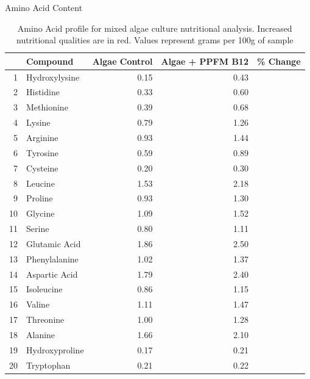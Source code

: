 \documentclass[8pt]{beamer}\usepackage[]{graphicx}\usepackage[]{color}
\begin{document}
\begin{frame}{Amino Acid Content}

\begin{table}[ht]
\centering
{\small
\begin{tabular}{rlrrl}
  \hline
 & Compound & Algae Control & Algae + PPFM B12 & \% Change \\ 
  \hline
1 & Hydroxylysine & 0.15 & 0.43 & \textbf{\color{red}{186.67}} \\ 
  2 & Histidine & 0.33 & 0.60 & \textbf{\color{red}{81.82}} \\ 
  3 & Methionine & 0.39 & 0.68 & \textbf{\color{red}{74.36}} \\ 
  4 & Lysine & 0.79 & 1.26 & \textbf{\color{red}{59.49}} \\ 
  5 & Arginine & 0.93 & 1.44 & \textbf{\color{red}{54.84}} \\ 
  6 & Tyrosine & 0.59 & 0.89 & \textbf{\color{red}{50.85}} \\ 
  7 & Cysteine & 0.20 & 0.30 & \textbf{\color{red}{50.00}} \\ 
  8 & Leucine & 1.53 & 2.18 & \textbf{\color{red}{42.48}} \\ 
  9 & Proline & 0.93 & 1.30 & \textbf{\color{red}{39.78}} \\ 
  10 & Glycine & 1.09 & 1.52 & \textbf{\color{red}{39.45}} \\ 
  11 & Serine & 0.80 & 1.11 & \textbf{\color{red}{38.75}} \\ 
  12 & Glutamic Acid & 1.86 & 2.50 & \textbf{\color{red}{34.41}} \\ 
  13 & Phenylalanine & 1.02 & 1.37 & \textbf{\color{red}{34.31}} \\ 
  14 & Aspartic Acid & 1.79 & 2.40 & \textbf{\color{red}{34.08}} \\ 
  15 & Isoleucine & 0.86 & 1.15 & \textbf{\color{red}{33.72}} \\ 
  16 & Valine & 1.11 & 1.47 & \textbf{\color{red}{32.43}} \\ 
  17 & Threonine & 1.00 & 1.28 & \textbf{\color{red}{28.00}} \\ 
  18 & Alanine & 1.66 & 2.10 & \textbf{\color{red}{26.51}} \\ 
  19 & Hydroxyproline & 0.17 & 0.21 & \textbf{\color{red}{23.53}} \\ 
  20 & Tryptophan & 0.21 & 0.22 & \textbf{\color{red}{4.76}} \\ 
   \hline
\end{tabular}
}
\caption{Amino Acid profile for mixed algae culture nutritional analysis. Increased nutritional qualities are in red. Values represent grams per 100g of sample} 
\label{tab:AminoAcids_trim}
\end{table}

\end{frame}
\end{document}
